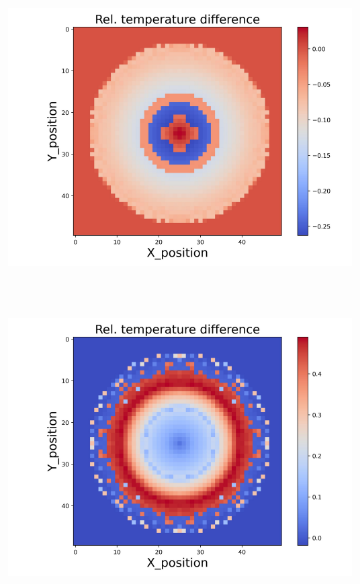 \begin{figure}[h]
\begin{minipage}{\textwidth}
\begin{subfigure}{0.325\textwidth}
            \centering
            \includegraphics[width=\textwidth]{figures/raw_data/31/linear/T_bias.jpg}
        \end{subfigure}
    \end{minipage}\\
    \begin{minipage}{\textwidth}
        \centering
        \begin{subfigure}{0.325\textwidth}
            \centering
            \includegraphics[width=\textwidth]{figures/raw_data/32/linear/T_bias.jpg}
        \end{subfigure}
        \begin{subfigure}{0.325\textwidth}

\end{subfigure}
\end{minipage}
\end{figure}
